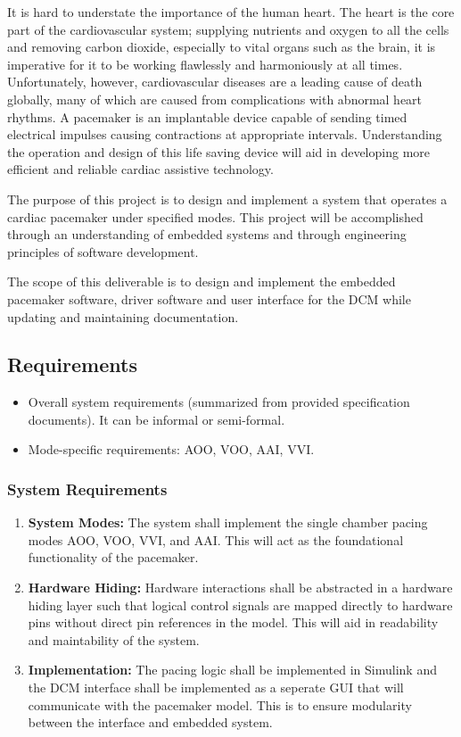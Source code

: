 \documentclass{article}
\begin{document}
It is hard to understate the importance of the human heart. The heart is the core part of the cardiovascular system; supplying nutrients and oxygen to all the cells
and removing carbon dioxide, especially to vital organs such as the brain, it is imperative for it to be working flawlessly and harmoniously at all times.
Unfortunately, however, cardiovascular diseases are a leading cause of death globally, many of which are caused from complications with 
abnormal heart rhythms. A pacemaker is an implantable device capable of sending timed electrical impulses causing contractions at 
appropriate intervals. Understanding the operation and design of this life saving device will aid in developing 
more efficient and reliable cardiac assistive technology. 

The purpose of this project is to design and implement a system that operates a cardiac pacemaker 
under specified modes. This project will be accomplished through an understanding of embedded systems and through engineering 
principles of software development. 

The scope of this deliverable is to design and implement the embedded pacemaker software, driver software and user interface for 
the DCM while updating and maintaining documentation. 



\subsection{Requirements}

\begin{itemize}
    \item Overall system requirements (summarized from provided specification documents). It can be informal or semi-formal.
    \item Mode-specific requirements: AOO, VOO, AAI, VVI.
\end{itemize}

\subsubsection{System Requirements}

\begin{enumerate}[label=]
    \item \textbf{System Modes:} The system shall implement the single chamber pacing modes AOO, VOO, VVI, and AAI. This will act 
    as the foundational functionality of the pacemaker. 
    \item \textbf{Hardware Hiding:} Hardware interactions shall be abstracted in a hardware hiding layer such that 
    logical control signals are mapped directly to hardware pins without direct pin references in the model. This 
    will aid in readability and maintability of the system.
    \item \textbf{Implementation:} The pacing logic shall be implemented in Simulink and the DCM interface shall 
    be implemented as a seperate GUI that will communicate with the pacemaker model. This is to ensure modularity 
    between the interface and embedded system.
\end{enumerate}
\end{document}
